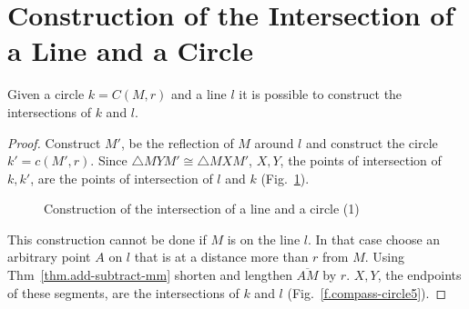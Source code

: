 
\section{Construction of the Intersection of a Line and a Circle}\label{s.line-circle}

\begin{theorem}
Given a circle $k=C(M,r)$ and a line $l$ it is possible to construct the intersections of $k$ and $l$.
\end{theorem}

\begin{proof}
Construct $M'$, be the reflection of $M$ around $l$ and construct the circle $k'=c(M',r)$. Since $\triangle MYM'\cong\triangle MXM'$, $X,Y$, the points of intersection of $k,k'$, are the points of intersection of $l$ and $k$ (Fig.~\ref{f.compass-circle4}).
\begin{figure}[t]
\begin{center}
\end{center}
\caption{Construction of  the intersection of a line and a circle (1)}\label{f.compass-circle4}
\end{figure}

This construction cannot be done if $M$ is on the line $l$. In that case choose an arbitrary point $A$ on $l$ that is at a distance more than $r$ from $M$. Using Thm~\ref{thm.add-subtract-mm} shorten and lengthen $\overline{AM}$ by $r$. $X,Y$, the endpoints of these segments, are the intersections of $k$ and $l$ (Fig.~\ref{f.compass-circle5}).
\end{proof}

